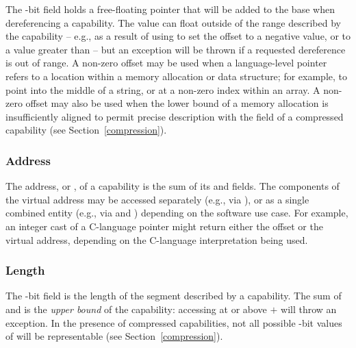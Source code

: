 The \xlen{}-bit \coffset{} field holds a free-floating pointer that will be
added to the base when dereferencing a capability.
The value can float outside of the range described by the capability -- e.g.,
as a result of using  to set the offset to a negative
value, or to a value greater than \clength{} -- but an exception will be
thrown if a requested dereference is out of range.
A non-zero offset may be used when a language-level pointer refers to a
location within a memory allocation or data structure; for example, to point
into the middle of a string, or at a non-zero index within an array.
A non-zero offset may also be used when the lower bound of a memory allocation
is insufficiently aligned to permit precise description with the \cbase{}
field of a compressed capability (see Section~\ref{compression}).

\subsubsection{Address}

The address, or \ccursor{}, of a capability is the sum of its
\cbase{} and \coffset{} fields.
The components of the virtual address may be accessed separately (e.g., via
), or as a single combined entity (e.g., via
 and ) depending on the software
use case.
For example, an integer cast of a C-language pointer might return either the
offset or the virtual address, depending on the C-language interpretation
being used.


\subsubsection{Length}

The \xlen{}-bit \clength{} field is the length of the segment described by a
capability.
The sum of \cbase{} and \clength{} is the \textit{upper bound} of the
capability: accessing at or above \cbase{} $+$ \clength{} will throw an
exception.
In the presence of compressed capabilities, not all possible \xlen{}-bit
values of \clength{} will be representable (see Section~\ref{compression}).


